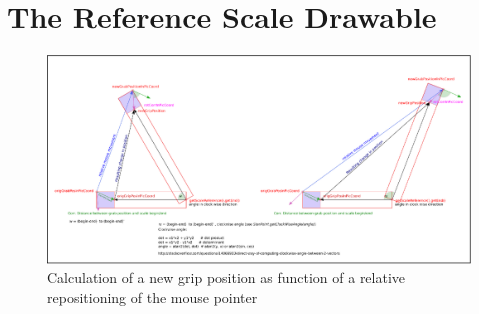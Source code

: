\documentclass[a4paper]{book}
\begin{document}
\section{The Reference Scale Drawable}

    

	\begin{figure}[htbp]
  		\centering
  		\includegraphics[width=\textwidth]{scaleDescription.eps}
  		\caption{Calculation of a new grip position as function of a relative repositioning of the mouse 	pointer}
	\end{figure}
\end{document}
